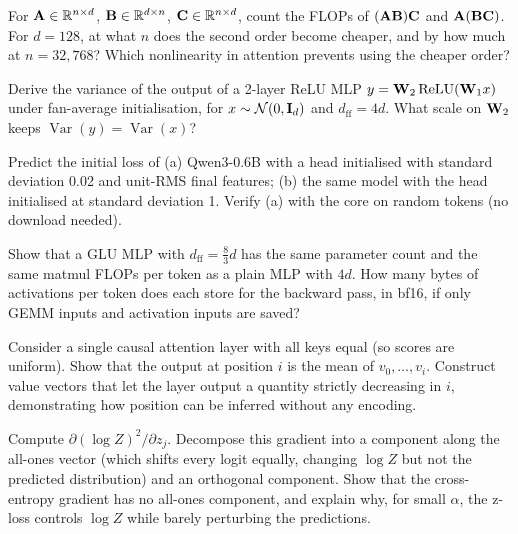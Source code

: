\begin{exercise}
For $\mathbf{A}\in\mathbb{R}^{n\times d}$, $\mathbf{B}\in\mathbb{R}^{d\times n}$, $\mathbf{C}\in\mathbb{R}^{n\times d}$, count the FLOPs of
$(\mathbf{A}\mathbf{B})\mathbf{C}$ and $\mathbf{A}(\mathbf{B}\mathbf{C})$. For $d=128$, at what $n$ does the second order
become cheaper, and by how much at $n=32{,}768$? Which nonlinearity in attention prevents using the
cheaper order?
\end{exercise}

\begin{exercise}
Derive the variance of the output of a 2-layer ReLU MLP $y=\mathbf{W}_2\,\mathrm{ReLU}(\mathbf{W}_1x)$ under
fan-average initialisation, for $x\sim\mathcal{N}(0,\mathbf{I}_d)$ and $d_\text{ff}=4d$. What scale on
$\mathbf{W}_2$ keeps $\operatorname{Var}(y)=\operatorname{Var}(x)$?
\end{exercise}

\begin{exercise}
Predict the initial loss of (a) Qwen3-0.6B with a head initialised with standard deviation 0.02 and
unit-RMS final features; (b) the same model with the head initialised at standard deviation 1. Verify
(a) with the core  on random tokens (no download needed).
\end{exercise}

\begin{exercise}
Show that a GLU MLP with $d_\text{ff}=\frac83d$ has the same parameter count and the same matmul FLOPs per
token as a plain MLP with $4d$. How many bytes of activations per token does each store for the
backward pass, in bf16, if only GEMM inputs and activation inputs are saved?
\end{exercise}

\begin{exercise}
Consider a single causal attention layer with all keys equal (so scores are uniform). Show that the
output at position $i$ is the mean of $v_0,\ldots,v_i$. Construct value vectors that let the layer output
a quantity strictly decreasing in $i$, demonstrating how position can be inferred without any encoding.
\end{exercise}

\begin{exercise}
Compute $\partial(\log Z)^2/\partial z_j$. Decompose this gradient into a component along the all-ones
vector (which shifts every logit equally, changing $\log Z$ but not the predicted distribution) and an
orthogonal component. Show that the cross-entropy gradient has no all-ones component, and explain why, for
small $\alpha$, the z-loss controls $\log Z$ while barely perturbing the predictions.
\end{exercise}


